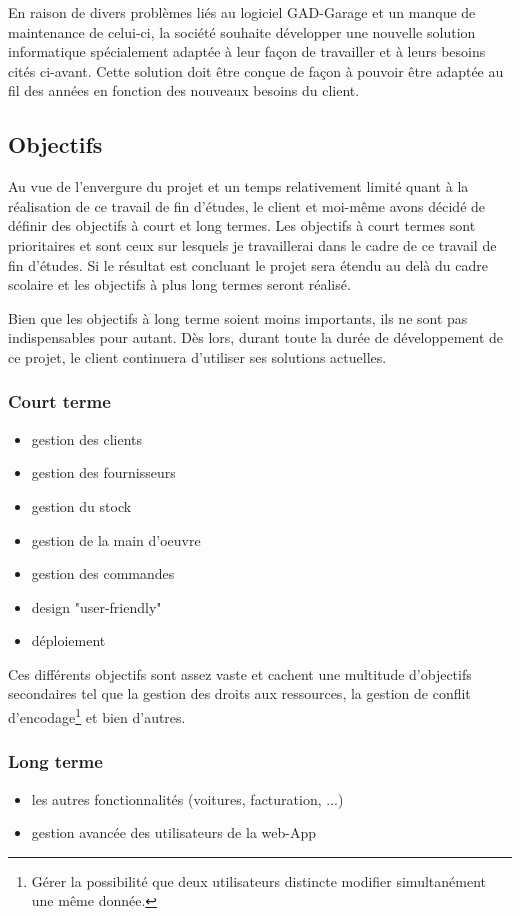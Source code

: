 \newpara

En raison de divers problèmes liés au logiciel GAD-Garage et un manque de maintenance de celui-ci, la société souhaite développer une nouvelle solution informatique spécialement adaptée à leur façon de travailler et à leurs besoins cités ci-avant. Cette solution doit être conçue de façon à pouvoir être adaptée au fil des années en fonction des nouveaux besoins du client.

\subsection{Objectifs}

Au vue de l'envergure du projet et un temps relativement limité quant à la réalisation de ce travail de fin d'études, le client et moi-même avons décidé de définir des objectifs à court et long termes. Les objectifs à court termes sont prioritaires et sont ceux sur lesquels je travaillerai dans le cadre de ce travail de fin d'études. Si le résultat est concluant le projet sera étendu au delà du cadre scolaire et les objectifs à plus long termes seront réalisé. 

\newpara

Bien que les objectifs à long terme soient moins importants, ils ne sont pas indispensables pour autant. Dès lors, durant toute la durée de développement de ce projet, le client continuera d'utiliser ses solutions actuelles. 

\subsubsection{Court terme}

\begin{itemize}
  \item gestion des clients 
  \item gestion des fournisseurs
  \item gestion du stock
  \item gestion de la main d'oeuvre
  \item gestion des commandes 
  \item design "user-friendly"
  \item déploiement
\end{itemize}

\newpara

Ces différents objectifs sont assez vaste et cachent une multitude d'objectifs secondaires tel que la gestion des droits aux ressources, la gestion de conflit d'encodage\footnote{Gérer la possibilité que deux utilisateurs distincte modifier simultanément une même donnée.} et bien d'autres.  

\subsubsection{Long terme}

\begin{itemize}
  \item les autres fonctionnalités (voitures, facturation, ...)
  \item gestion avancée des utilisateurs de la web-App
\end{itemize}